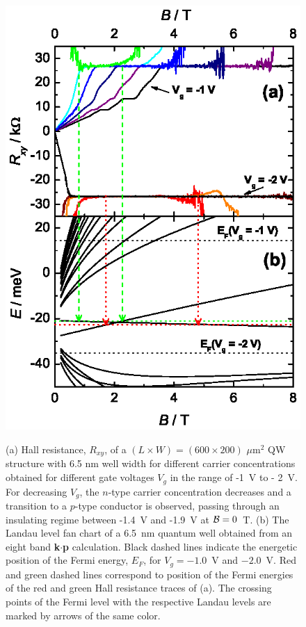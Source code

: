 \documentclass{article}
\begin{document}
\begin{figure}[p]
\centering
 \includegraphics[width=0.8\linewidth]{80608Fig11.eps}\\
 \caption{(a) Hall resistance, $R_{xy}$, of a $(L\times W) =
(600\times 200)$ $\mu$m$^2$
 QW structure with 6.5 nm well width for different carrier
concentrations obtained for
 different gate voltages $V_g$ in the range of -1~V to - 2~V. For
decreasing $V_g$,
 the $n$-type carrier concentration decreases and a transition to a
$p$-type conductor
 is observed, passing through an insulating regime  between -1.4~V and -1.9~V at
 ${\cal{B}}=0$~T.
(b) The Landau level fan chart of a 6.5~nm quantum well obtained
from an eight band {\bf k$\cdot$p} calculation. Black dashed lines
indicate the energetic position of the Fermi energy, $E_F$, for $V_g
= -1.0$~V and $-2.0$~V. Red and green dashed lines correspond to
position of the Fermi energies of the red and green Hall resistance
traces of (a). The crossing points of the Fermi level with the
respective Landau levels are marked by arrows of the same
color.}\label{FigexpBcross}
\end{figure}
\end{document}

